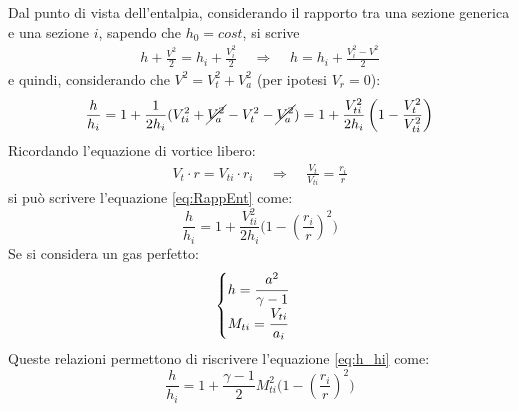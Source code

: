 Dal punto di vista dell'entalpia, considerando il rapporto tra una sezione generica e una sezione $i$, sapendo che $h_0 = cost$, si scrive
\begin{align*}
h + \frac{V^2}{2} = h_i + \frac{V_i^2}{2} \;\;\;\; \Rightarrow \;\;\;\; h = h_i	+ \frac{V_i^2 - V^2}{2}
\end{align*}
e quindi, considerando che $V^2=V_t^2+V_a^2$ (per ipotesi $V_r=0$):
\begin{equation}
\frac{h}{h_i} = 1 + \frac{1}{2h_i} (V_{ti}^2+ \cancel{V_a^2}-V_t^2 -\cancel{V_a^2}) = 1 + \frac{V_{ti}^2}{2h_i} \left( 1- \frac{V_t^2}{V_{ti}^2} \right)
\label{eq:RappEnt}
\end{equation}
Ricordando l'equazione di vortice libero:
\begin{align*}
V_t \cdot r = V_{ti} \cdot r_i \;\;\;\; \Rightarrow \;\;\;\; \frac{V_t}{V_{ti}} = \frac{r_i}{r}
\end{align*}
si può scrivere l'equazione \ref{eq:RappEnt} come:
\begin{equation}\label{eq:h_hi}
\boxed{\frac{h}{h_i} = 1 + \frac{V_{ti}^2}{2h_i} \bigg(1 -  \left( \frac{r_i}{r}\right)^2 \bigg)}
\end{equation}
Se si considera un gas perfetto:
\begin{equation}\label{eq:condgasperf}
\begin{cases}
h = \cfrac{a ^ 2}{\gamma - 1} \\
M_{ti} = \cfrac{V_{ti}}{a_i}
\end{cases}
\end{equation}
Queste relazioni permettono di riscrivere l'equazione \ref{eq:h_hi} come:
\begin{equation}
\boxed{\frac{h}{h_i} = 1 + \frac{\gamma -1}{2} M_{ti}^2 \bigg(1 -  \left( \frac{r_i}{r}\right)^2 \bigg) }
\end{equation}


